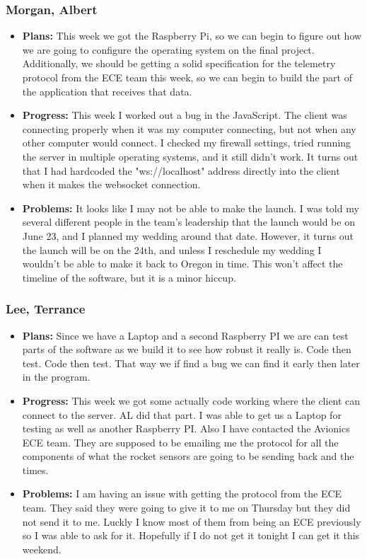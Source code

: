 \documentclass[10pt,draftclsnofoot,onecolumn]{IEEEtran}
\begin{document}
\subsubsection{Morgan, Albert}
\begin{itemize}
	\item \textbf{Plans: }
	This week we got the Raspberry Pi, so we can begin to figure out how we are going to configure the operating system on the final project. Additionally, we should be getting a solid specification for the telemetry protocol from the ECE team this week, so we can begin to build the part of the application that receives that data.
	\item \textbf{Progress: }
	This week I worked out a bug in the JavaScript. The client was connecting properly when it was my computer connecting, but not when any other computer would connect. I checked my firewall settings, tried running the server in multiple operating systems, and it still didn't work. It turns out that I had hardcoded the "ws://localhost" address directly into the client when it makes the websocket connection.
	\item \textbf{Problems: }
	It looks like I may not be able to make the launch. I was told my several different people in the team's leadership that the launch would be on June 23, and I planned my wedding around that date. However, it turns out the launch will be on the 24th, and unless I reschedule my wedding I wouldn't be able to make it back to Oregon in time. This won't affect the timeline of the software, but it is a minor hiccup.
\end{itemize}
\subsubsection{Lee, Terrance}
\begin{itemize}
	\item \textbf{Plans: }
	Since we have a Laptop and a second Raspberry PI we are can test parts of the software as we build it to see how robust it really is. Code then test. Code then test. That way we if find a bug we can find it early then later in the program.
	\item \textbf{Progress: }
	This week we got some actually code working where the client can connect to the server. AL did that part. I was able to get us a Laptop for testing as well as another Raspberry PI. Also I have contacted the Avionics ECE team. They are supposed to be emailing me the protocol for all the components of what the rocket sensors are going to be sending back and the times.
	\item \textbf{Problems: }
	I am having an issue with getting the protocol from the ECE team. They said they were going to give it to me on Thursday but they did not send it to me. Luckly I know most of them from being an ECE previously so I was able to ask for it. Hopefully if I do not get it tonight I can get it this weekend.
\end{itemize}
\end{document}
